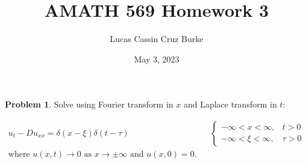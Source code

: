 \documentclass[12pt,a4paper]{article}
\title{AMATH 569 Homework 3}
\author{Lucas Cassin Cruz Burke}
\date{May 3, 2023}
\theoremstyle{definition}
\newtheorem{problem}{Problem}
\theoremstyle{remark}
\begin{document}
\maketitle

\begin{problem}
    Solve using Fourier transform in $x$ and Laplace transform in $t$: 

    \begin{align*}
        u_t - Du_{xx} = \delta(x-\xi)\delta(t-\tau) && \begin{cases}
            -\infty < x < \infty, & t >0 \\ -\infty < \xi < \infty, & \tau >0
        \end{cases} \\
        \text{where $u(x,t) \rightarrow 0$ as $x \rightarrow \pm \infty$ and $u(x,0)=0$.}
    \end{align*}
\end{problem}
\end{document}
